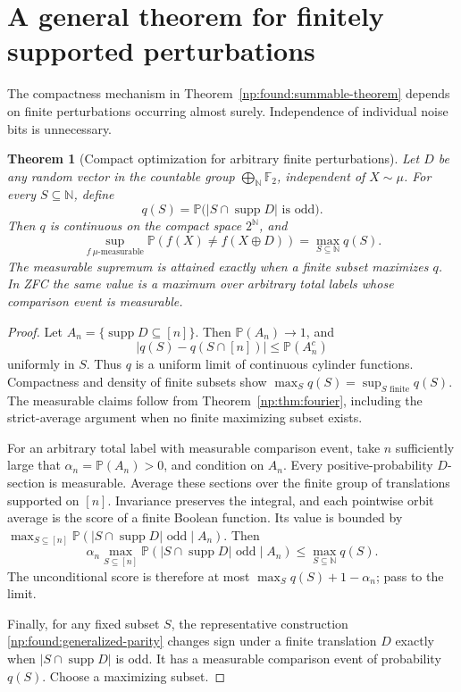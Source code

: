 \documentclass[11pt,a4paper]{article}
\newtheorem{theorem}{Theorem}[section]
\theoremstyle{definition}
\theoremstyle{remark}
\newcommand{\N}{\mathbb N}
\newcommand{\Pbb}{\mathbb P}
\newcommand{\Ftwo}{\mathbb F_2}
\newcommand{\supp}{\operatorname{supp}}
\begin{document}
\section{A general theorem for finitely supported perturbations}
\label{np:sec:finiteperturb}

The compactness mechanism in Theorem~\ref{np:found:summable-theorem}
depends on finite perturbations occurring almost surely. Independence of
individual noise bits is unnecessary.

\begin{theorem}[Compact optimization for arbitrary finite perturbations]
\label{np:thm:finiteperturb}
Let \(D\) be any random vector in the countable group
\(\bigoplus_{\N}\Ftwo\), independent of \(X\sim\mu\). For every
\(S\subseteq\N\), define
\[
 q(S)=\Pbb\bigl(|S\cap\supp D|\text{ is odd}\bigr).
\]
Then \(q\) is continuous on the compact space \(2^\N\), and
\[
 \sup_{f\ \mu\text{-measurable}}\Pbb(f(X)\ne f(X\oplus D))
 =\max_{S\subseteq\N}q(S).
\]
The measurable supremum is attained exactly when a finite subset maximizes
\(q\). In ZFC the same value is a maximum over arbitrary total labels
whose comparison event is measurable.
\end{theorem}
\begin{proof}
Let \(A_n=\{\supp D\subseteq[n]\}\). Then \(\Pbb(A_n)\to1\), and
\[
 |q(S)-q(S\cap[n])|\le\Pbb(A_n^c)
\]
uniformly in \(S\). Thus \(q\) is a uniform limit of continuous cylinder
functions. Compactness and density of finite subsets show
\(\max_Sq(S)=\sup_{S\text{ finite}}q(S)\). The measurable claims follow
from Theorem~\ref{np:thm:fourier}, including the strict-average argument
when no finite maximizing subset exists.

For an arbitrary total label with measurable comparison event, take \(n\)
sufficiently large that \(\alpha_n=\Pbb(A_n)>0\), and condition on \(A_n\). Every positive-probability \(D\)-section is measurable.
Average these sections over the finite group of translations supported
on \([n]\). Invariance preserves the integral, and each pointwise orbit
average is the score of a finite Boolean function. Its value is bounded
by \(\max_{S\subseteq[n]}\Pbb(|S\cap\supp D|\text{ odd}\mid A_n)\).
Then
\[
 \alpha_n\max_{S\subseteq[n]}\Pbb(|S\cap\supp D|\text{ odd}\mid A_n)
 \le \max_{S\subseteq\N}q(S).
\]
The unconditional score is therefore at most
\(\max_Sq(S)+1-\alpha_n\); pass to the limit.

Finally, for any fixed subset \(S\), the representative construction
\eqref{np:found:generalized-parity} changes sign under a finite
translation \(D\) exactly when \(|S\cap\supp D|\) is odd.
It has a measurable comparison event of probability \(q(S)\).
Choose a maximizing subset.
\end{proof}
\end{document}
